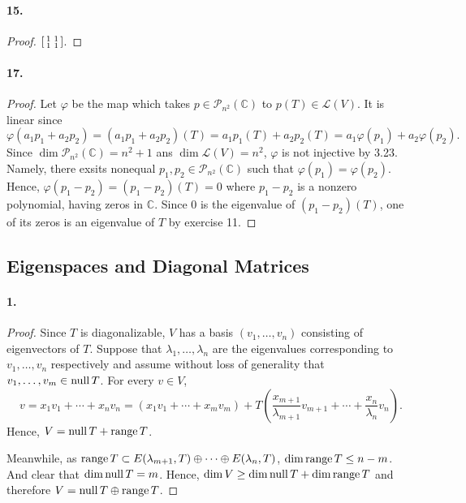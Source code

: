   \paragraph{15.}
  \begin{proof}
    $\begin{bsmallmatrix} 1 & 1 \\ 1 & 1 \end{bsmallmatrix}$.
  \end{proof}

  \paragraph{17.}
  \begin{proof}
    Let $\varphi$ be the map which takes $p\in\mathcal{P}_{n^2}(\mathbb{C})$ to
    $p(T)\in\mathcal{L}(V)$. It is linear since
    \[
      \varphi(a_1p_1+a_2p_2) = (a_1p_1+a_2p_2)(T) = a_1p_1(T)+a_2p_2(T)=
      a_1\varphi(p_1)+a_2\varphi(p_2).
    \]
    Since $\dim\mathcal{P}_{n^2}(\mathbb{C})=n^2+1$ ans $\dim\mathcal{L}(V) =
    n^2$, $\varphi$ is not injective by 3.23. Namely, there exsits nonequal $p_1
    ,p_2\in\mathcal{P}_{n^2}(\mathbb{C})$ such that $\varphi(p_1)=\varphi(p_2)$.
    Hence, $\varphi(p_1-p_2)=(p_1-p_2)(T)=0$ where $p_1-p_2$ is a nonzero 
    polynomial, having zeros in $\mathbb{C}$. Since $0$ is the eigenvalue of 
    $(p_1-p_2)(T)$, one of its zeros is an eigenvalue of $T$ by exercise 11.
  \end{proof}


\iffalse
\subsection{Eigenspaces and Diagonal Matrices}
  \paragraph{1.}
  \begin{proof}
    Since $T$ is diagonalizable, $V$ has a basis $(v_1,\dots,v_n)$ consisting of
    eigenvectors of $T$. Suppose that $\lambda_1,\dots,\lambda_n$ are the 
    eigenvalues corresponding to $v_1,\dots,v_n$ respectively and assume without
    loss of generality that $v_1,\dots,v_m\in\operatorname{null} T$. For every $v\in V$,
    \[
      v=x_1v_1+\cdots+x_nv_n
      =(x_1v_1+\cdots+x_mv_m) 
      +T\left( \frac{x_{m+1}}{\lambda_{m+1}}v_{m+1}+\cdots
      +\frac{x_n}{\lambda_n}v_n \right).
    \]
    Hence, $V=\operatorname{null} T + \operatorname{range} T$. \par
    Meanwhile, as $\operatorname{range} T\subset E(\lambda_{m+1},T)\oplus\cdots\oplus 
    E(\lambda_n, T)$, $\dim\operatorname{range} T\le n-m$. And clear that $\dim\operatorname{null} T=m$. 
    Hence, $\dim V\ge \dim\operatorname{null} T+\dim\operatorname{range} T$ and therefore $V=\operatorname{null} T\oplus
    \operatorname{range} T$.
  \end{proof}


